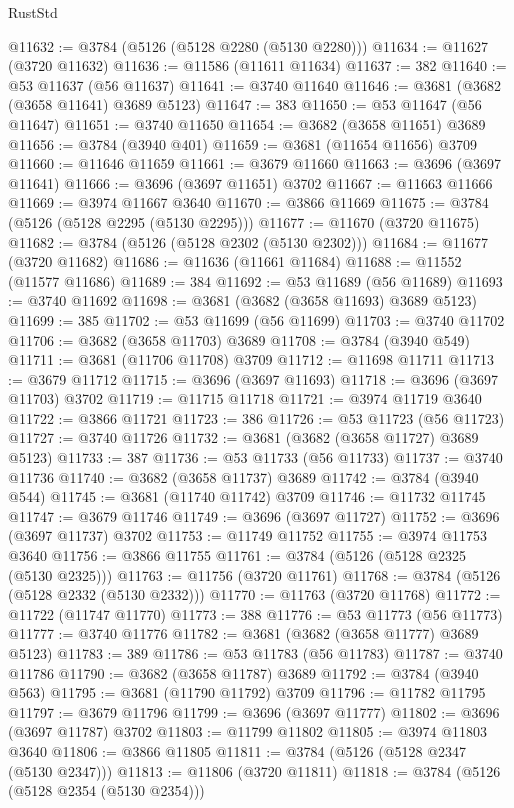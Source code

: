 \begin{lexlean}{RustStd}
\begin{coremodule}
@11632 := @3784 (@5126 (@5128 @2280 (@5130 @2280)))
@11634 := @11627 (@3720 @11632)
@11636 := @11586 (@11611 @11634)
@11637 := 382
@11640 := @53 @11637 (@56 @11637)
@11641 := @3740 @11640
@11646 := @3681 (@3682 (@3658 @11641) @3689 @5123)
@11647 := 383
@11650 := @53 @11647 (@56 @11647)
@11651 := @3740 @11650
@11654 := @3682 (@3658 @11651) @3689
@11656 := @3784 (@3940 @401)
@11659 := @3681 (@11654 @11656) @3709
@11660 := @11646 @11659
@11661 := @3679 @11660
@11663 := @3696 (@3697 @11641)
@11666 := @3696 (@3697 @11651) @3702
@11667 := @11663 @11666
@11669 := @3974 @11667 @3640
@11670 := @3866 @11669
@11675 := @3784 (@5126 (@5128 @2295 (@5130 @2295)))
@11677 := @11670 (@3720 @11675)
@11682 := @3784 (@5126 (@5128 @2302 (@5130 @2302)))
@11684 := @11677 (@3720 @11682)
@11686 := @11636 (@11661 @11684)
@11688 := @11552 (@11577 @11686)
@11689 := 384
@11692 := @53 @11689 (@56 @11689)
@11693 := @3740 @11692
@11698 := @3681 (@3682 (@3658 @11693) @3689 @5123)
@11699 := 385
@11702 := @53 @11699 (@56 @11699)
@11703 := @3740 @11702
@11706 := @3682 (@3658 @11703) @3689
@11708 := @3784 (@3940 @549)
@11711 := @3681 (@11706 @11708) @3709
@11712 := @11698 @11711
@11713 := @3679 @11712
@11715 := @3696 (@3697 @11693)
@11718 := @3696 (@3697 @11703) @3702
@11719 := @11715 @11718
@11721 := @3974 @11719 @3640
@11722 := @3866 @11721
@11723 := 386
@11726 := @53 @11723 (@56 @11723)
@11727 := @3740 @11726
@11732 := @3681 (@3682 (@3658 @11727) @3689 @5123)
@11733 := 387
@11736 := @53 @11733 (@56 @11733)
@11737 := @3740 @11736
@11740 := @3682 (@3658 @11737) @3689
@11742 := @3784 (@3940 @544)
@11745 := @3681 (@11740 @11742) @3709
@11746 := @11732 @11745
@11747 := @3679 @11746
@11749 := @3696 (@3697 @11727)
@11752 := @3696 (@3697 @11737) @3702
@11753 := @11749 @11752
@11755 := @3974 @11753 @3640
@11756 := @3866 @11755
@11761 := @3784 (@5126 (@5128 @2325 (@5130 @2325)))
@11763 := @11756 (@3720 @11761)
@11768 := @3784 (@5126 (@5128 @2332 (@5130 @2332)))
@11770 := @11763 (@3720 @11768)
@11772 := @11722 (@11747 @11770)
@11773 := 388
@11776 := @53 @11773 (@56 @11773)
@11777 := @3740 @11776
@11782 := @3681 (@3682 (@3658 @11777) @3689 @5123)
@11783 := 389
@11786 := @53 @11783 (@56 @11783)
@11787 := @3740 @11786
@11790 := @3682 (@3658 @11787) @3689
@11792 := @3784 (@3940 @563)
@11795 := @3681 (@11790 @11792) @3709
@11796 := @11782 @11795
@11797 := @3679 @11796
@11799 := @3696 (@3697 @11777)
@11802 := @3696 (@3697 @11787) @3702
@11803 := @11799 @11802
@11805 := @3974 @11803 @3640
@11806 := @3866 @11805
@11811 := @3784 (@5126 (@5128 @2347 (@5130 @2347)))
@11813 := @11806 (@3720 @11811)
@11818 := @3784 (@5126 (@5128 @2354 (@5130 @2354)))

\end{coremodule}
\end{lexlean}
